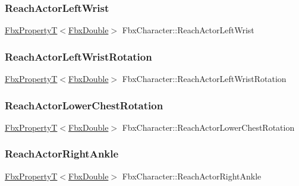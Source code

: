 \subsubsection{\texorpdfstring{Reach\+Actor\+Left\+Wrist}{ReachActorLeftWrist}}
{\footnotesize\ttfamily \hyperlink{class_fbx_property_t}{Fbx\+PropertyT}$<$\hyperlink{fbxtypes_8h_a171e72a1c46fc15c1a6c9c31948c1c5b}{Fbx\+Double}$>$ Fbx\+Character\+::\+Reach\+Actor\+Left\+Wrist}

\mbox{\label{class_fbx_character_ac011fdca558e2018ae4cb2209df328e2}} 
\subsubsection{\texorpdfstring{Reach\+Actor\+Left\+Wrist\+Rotation}{ReachActorLeftWristRotation}}
{\footnotesize\ttfamily \hyperlink{class_fbx_property_t}{Fbx\+PropertyT}$<$\hyperlink{fbxtypes_8h_a171e72a1c46fc15c1a6c9c31948c1c5b}{Fbx\+Double}$>$ Fbx\+Character\+::\+Reach\+Actor\+Left\+Wrist\+Rotation}

\mbox{\label{class_fbx_character_a1c9c043f80be7d8e7ce15b67d8e66239}} 
\subsubsection{\texorpdfstring{Reach\+Actor\+Lower\+Chest\+Rotation}{ReachActorLowerChestRotation}}
{\footnotesize\ttfamily \hyperlink{class_fbx_property_t}{Fbx\+PropertyT}$<$\hyperlink{fbxtypes_8h_a171e72a1c46fc15c1a6c9c31948c1c5b}{Fbx\+Double}$>$ Fbx\+Character\+::\+Reach\+Actor\+Lower\+Chest\+Rotation}

\mbox{\label{class_fbx_character_abab10ebadfb1879a264e48dccd429874}} 
\subsubsection{\texorpdfstring{Reach\+Actor\+Right\+Ankle}{ReachActorRightAnkle}}
{\footnotesize\ttfamily \hyperlink{class_fbx_property_t}{Fbx\+PropertyT}$<$\hyperlink{fbxtypes_8h_a171e72a1c46fc15c1a6c9c31948c1c5b}{Fbx\+Double}$>$ Fbx\+Character\+::\+Reach\+Actor\+Right\+Ankle}

